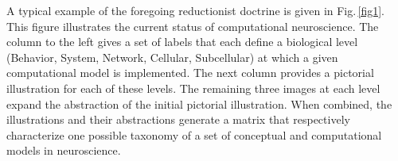 \documentclass[10pt,letterpaper]{article}
\begin{document}


A typical example of the foregoing reductionist doctrine is given in Fig.\,\ref{fig1}. This figure illustrates the current status of computational neuroscience. The column to the left gives a set of labels that each define a biological level (Behavior, System, Network, Cellular, Subcellular) at which a given computational model is implemented. The next column provides a pictorial illustration for each of these levels. The remaining three images at each level expand the abstraction of the initial pictorial illustration. When combined, the illustrations and their abstractions generate a matrix that respectively characterize one possible taxonomy of a set of conceptual and computational models in neuroscience.
\end{document}
